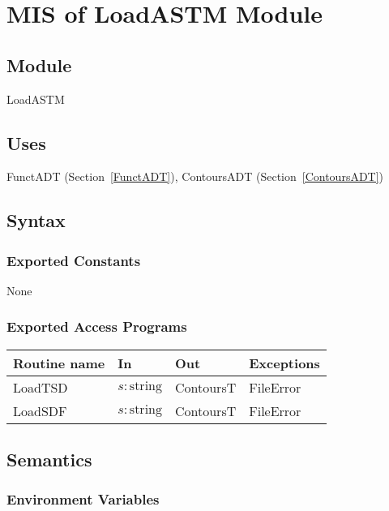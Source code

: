 \documentclass[12pt, titlepage]{article}
\begin{document}
\newpage


\section{MIS of LoadASTM Module} \label{LoadASTM}

\subsection {Module}

LoadASTM

\subsection {Uses}

FunctADT (Section~\ref{FunctADT}), ContoursADT (Section~\ref{ContoursADT})

\subsection {Syntax}

\subsubsection {Exported Constants}

None

\subsubsection {Exported Access Programs}

\begin{tabular}{| l | l | l | l |}
\hline
\textbf{Routine name} & \textbf{In} & \textbf{Out} & \textbf{Exceptions}\\
\hline
LoadTSD & $s: \mbox{string}$ & ContoursT & FileError\\
\hline
LoadSDF & $s: \mbox{string}$ & ContoursT & FileError\\
\hline
\end{tabular}

\subsection {Semantics}

\subsubsection {Environment Variables}
\end{document}
